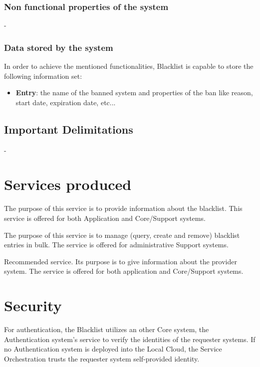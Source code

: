\documentclass[a4paper]{arrowhead}
\begin{document}
\subsubsection {Non functional properties of the system}
-

\subsubsection {Data stored by the system}
In order to achieve the mentioned functionalities, Blacklist is capable to store the following information set:

\begin{itemize}
    \item \textbf{Entry}: the name of the banned system and properties of the ban like reason, start date, expiration date, etc...
\end{itemize}

\subsection{Important Delimitations}
\label{sec:delimitations}
-

\newpage

\section{Services produced}
\label{sec:services}

{}
The purpose of this service is to provide information about the blacklist. This service is offered for both Application and Core/Support systems.

The purpose of this service is to manage (query, create and remove) blacklist entries in bulk. The service is offered for administrative Support systems.

Recommended service. Its purpose is to give information about the provider system. The service is offered for both application and Core/Support systems.

\newpage

\section{Security}
\label{sec:security}

For authentication, the Blacklist utilizes an other Core system, the Authentication system's service to verify the identities of the requester systems. If no Authentication system is deployed into the Local Cloud, the Service Orchestration trusts the requester system self-provided identity.
\end{document}
